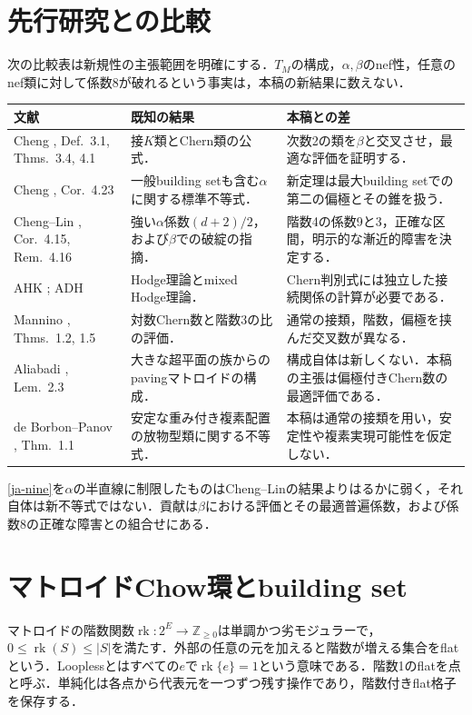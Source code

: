 \documentclass[12pt]{amsart}
\theoremstyle{definition}
\theoremstyle{remark}
\numberwithin{equation}{section}
\newcommand{\rk}{\operatorname{rk}}
\newcommand{\Z}{\mathbb{Z}}
\begin{document}
\section{先行研究との比較}
次の比較表は新規性の主張範囲を明確にする．$T_M$の構成，$\alpha,\beta$のnef性，任意のnef類に対して係数8が破れるという事実は，本稿の新結果に数えない．
\begin{center}\small
\begin{tabularx}{\textwidth}{@{}p{3.0cm}XX@{}}
\toprule
文献&既知の結果&本稿との差\\\midrule
Cheng \cite{Che}, Def.~3.1, Thms.~3.4, 4.1&接$K$類とChern類の公式．&次数2の類を$\beta$と交叉させ，最適な評価を証明する．\\
Cheng \cite{CheG}, Cor.~4.23&一般building setも含む$\alpha$に関する標準不等式．&新定理は最大building setでの第二の偏極とその錐を扱う．\\
Cheng--Lin \cite{CL}, Cor.~4.15, Rem.~4.16&強い$\alpha$係数$(d+2)/2$，および$\beta$での破綻の指摘．&階数4の係数9と3，正確な区間，明示的な漸近的障害を決定する．\\
AHK \cite{AHK}; ADH \cite{ADH}&Hodge理論とmixed Hodge理論．&Chern判別式には独立した接続関係の計算が必要である．\\
Mannino \cite{Man}, Thms.~1.2, 1.5&対数Chern数と階数3の比の評価．&通常の接類，階数，偏極を挟んだ交叉数が異なる．\\
Aliabadi \cite{Ali}, Lem.~2.3&大きな超平面の族からのpavingマトロイドの構成．&構成自体は新しくない．本稿の主張は偏極付きChern数の最適評価である．\\
de Borbon--Panov \cite{BP}, Thm.~1.1&安定な重み付き複素配置の放物型類に関する不等式．&本稿は通常の接類を用い，安定性や複素実現可能性を仮定しない．\\
\bottomrule
\end{tabularx}
\end{center}
\eqref{ja-nine}を$\alpha$の半直線に制限したものはCheng--Linの結果よりはるかに弱く，それ自体は新不等式ではない．貢献は$\beta$における評価とその最適普遍係数，および係数8の正確な障害との組合せにある．

\section{マトロイドChow環とbuilding set}
マトロイドの階数関数$\rk:2^E\to\Z_{\geq0}$は単調かつ劣モジュラーで，$0\leq\rk(S)\leq|S|$を満たす．外部の任意の元を加えると階数が増える集合をflatという．Looplessとはすべての$e$で$\rk\{e\}=1$という意味である．階数1のflatを点と呼ぶ．単純化は各点から代表元を一つずつ残す操作であり，階数付きflat格子を保存する．
\end{document}
